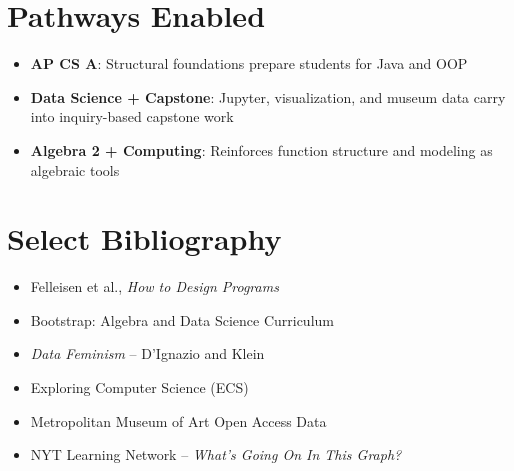 \documentclass[11pt]{article}
\begin{document}
\section*{Pathways Enabled}
\begin{itemize}[noitemsep]
  \item \textbf{AP CS A}: Structural foundations prepare students for Java and OOP
  \item \textbf{Data Science + Capstone}: Jupyter, visualization, and museum data carry into inquiry-based capstone work
  \item \textbf{Algebra 2 + Computing}: Reinforces function structure and modeling as algebraic tools
\end{itemize}

\section*{Select Bibliography}
\begin{itemize}[noitemsep]
  \item Felleisen et al., \textit{How to Design Programs}
  \item Bootstrap: Algebra and Data Science Curriculum
  \item \textit{Data Feminism} – D'Ignazio and Klein
  \item Exploring Computer Science (ECS)
  \item Metropolitan Museum of Art Open Access Data
  \item NYT Learning Network – \textit{What's Going On In This Graph?}
\end{itemize}
\end{document}
